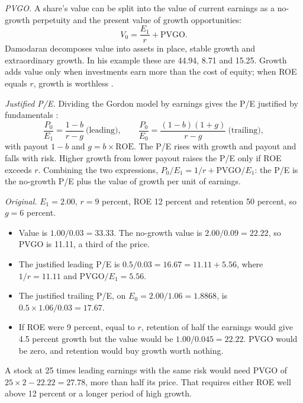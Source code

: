 \begin{qfmethod}\label{meth:pvgo-justified-pe}
 \emph{PVGO.} A share's value can be split into the value of current earnings as a no-growth perpetuity and the present value of growth opportunities:
\[ V_0=\frac{E_1}{r}+\mathrm{PVGO}. \]
Damodaran decomposes value into assets in place, stable growth and extraordinary growth. In his example these are 44.94, 8.71 and 15.25. Growth adds value only when investments earn more than the cost of equity; when ROE equals $r$, growth is worthless \citep[pp.~337--338]{investment-valuation-2012}.

\emph{Justified P/E.} Dividing the Gordon model by earnings gives the P/E justified by fundamentals \citep[pp.~460--461, 471--473]{investment-valuation-2012}:
\[ \frac{P_0}{E_1}=\frac{1-b}{r-g}\ \text{(leading)},\qquad\frac{P_0}{E_0}=\frac{(1-b)(1+g)}{r-g}\ \text{(trailing)}, \]
with payout $1-b$ and $g=b\times\mathrm{ROE}$. The P/E rises with growth and payout and falls with risk. Higher growth from lower payout raises the P/E only if ROE exceeds $r$. Combining the two expressions, $P_0/E_1=1/r+\mathrm{PVGO}/E_1$: the P/E is the no-growth P/E plus the value of growth per unit of earnings.

 \emph{Original.} $E_1=2.00$, $r=9$ percent, ROE 12 percent and retention 50 percent, so $g=6$ percent.
\begin{itemize}
\item Value is $1.00/0.03=33.33$. The no-growth value is $2.00/0.09=22.22$, so PVGO is 11.11, a third of the price.
\item The justified leading P/E is $0.5/0.03=16.67=11.11+5.56$, where $1/r=11.11$ and $\mathrm{PVGO}/E_1=5.56$.
\item The justified trailing P/E, on $E_0=2.00/1.06=1.8868$, is $0.5\times1.06/0.03=17.67$.
\item If ROE were 9 percent, equal to $r$, retention of half the earnings would give 4.5 percent growth but the value would be $1.00/0.045=22.22$. PVGO would be zero, and retention would buy growth worth nothing.
\end{itemize}
A stock at 25 times leading earnings with the same risk would need PVGO of $25\times2-22.22=27.78$, more than half its price. That requires either ROE well above 12 percent or a longer period of high growth.


\end{qfmethod}
